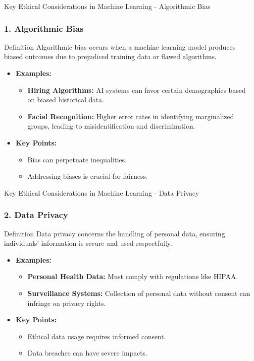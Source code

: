 \documentclass[aspectratio=169]{beamer}
\begin{document}
\begin{frame}[fragile]{Key Ethical Considerations in Machine Learning - Algorithmic Bias}
    \frametitle{1. Algorithmic Bias}
    
    \begin{block}{Definition}
        Algorithmic bias occurs when a machine learning model produces biased outcomes due to prejudiced training data or flawed algorithms.
    \end{block}
    
    \begin{itemize}
        \item \textbf{Examples:}
        \begin{itemize}
            \item \textbf{Hiring Algorithms:} AI systems can favor certain demographics based on biased historical data.
            \item \textbf{Facial Recognition:} Higher error rates in identifying marginalized groups, leading to misidentification and discrimination.
        \end{itemize}
        
        \item \textbf{Key Points:}
        \begin{itemize}
            \item Bias can perpetuate inequalities.
            \item Addressing biases is crucial for fairness.
        \end{itemize}
    \end{itemize}
\end{frame}

\begin{frame}[fragile]{Key Ethical Considerations in Machine Learning - Data Privacy}
    \frametitle{2. Data Privacy}
    
    \begin{block}{Definition}
        Data privacy concerns the handling of personal data, ensuring individuals’ information is secure and used respectfully.
    \end{block}
    
    \begin{itemize}
        \item \textbf{Examples:}
        \begin{itemize}
            \item \textbf{Personal Health Data:} Must comply with regulations like HIPAA.
            \item \textbf{Surveillance Systems:} Collection of personal data without consent can infringe on privacy rights.
        \end{itemize}
        
        \item \textbf{Key Points:}
        \begin{itemize}
            \item Ethical data usage requires informed consent.
            \item Data breaches can have severe impacts.
        \end{itemize}
    \end{itemize}
\end{frame}
\end{document}
